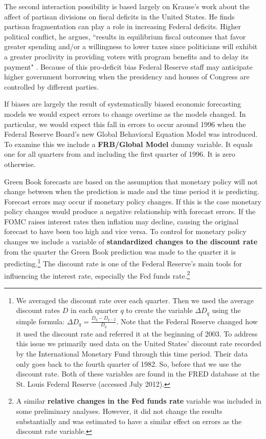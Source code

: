 \documentclass[a4paper]{article}\usepackage{graphicx, color}
\begin{document}
The second interaction possibility is based largely on Krause's \citeyearpar{Krause2000} work about the affect of partisan divisions on fiscal deficits in the United States. He finds partisan fragmentation can play a role in increasing Federal deficits. Higher political conflict, he argues, ``results in equilibrium fiscal outcomes that favor greater spending and/or a willingness to lower taxes since politicians will exhibit a greater proclivity in providing voters with program benefits and to delay its payment" \citep[][542]{Krause2000}. Because of this pro-deficit bias Federal Reserve staff may anticipate higher government borrowing when the presidency and houses of Congress are controlled by different parties. 

If biases are largely the result of systematically biased economic forecasting models we would expect errors to change overtime as the models changed. In particular, we would expect this fall in errors to occur around 1996 when the Federal Reserve Board's new Global Behavioral Equation Model was introduced. To examine this we include a {\bf{FRB/Global Model}} dummy variable. It equals one for all quarters from and including the first quarter of 1996. It is zero otherwise.

Green Book forecasts are based on the assumption that monetary policy will not change between when the prediction is made and the time period it is predicting. Forecast errors may occur if monetary policy changes. If this is the case monetary policy changes would produce a negative relationship with forecast errors. If the FOMC raises interest rates then inflation may decline, causing the original forecast to have been too high and vice versa. To control for monetary policy changes we include a variable of {\bf{standardized changes to the discount rate}} from the quarter the Green Book prediction was made to the quarter it is predicting.\footnote{We averaged the discount rate over each quarter. Then we used the average discount rates $D$ in each quarter $q$ to create the variable $\Delta D_{q}$ using the simple formula: $\Delta D_{q} = \frac{D_{q} - D_{q-2}}{D_{q}}$. Note that the Federal Reserve changed how it used the discount rate and referred it at the beginning of 2003. To address this issue we primarily used data on the United States' discount rate recorded by the International Monetary Fund through this time period. Their data only goes back to the fourth quarter of 1982. So, before that we use the discount rate. Both of these variables are found in the FRED database at the St. Louis Federal Reserve (accessed July 2012). } The discount rate is one of the Federal Reserve's main tools for influencing the interest rate, especially the Fed funds rate.\footnote{A similar {\bf{relative changes in the Fed funds rate}} variable was included in some preliminary analyses. However, it did not change the results substantially and was estimated to have a similar effect on errors as the discount rate variable.}
\end{document}
